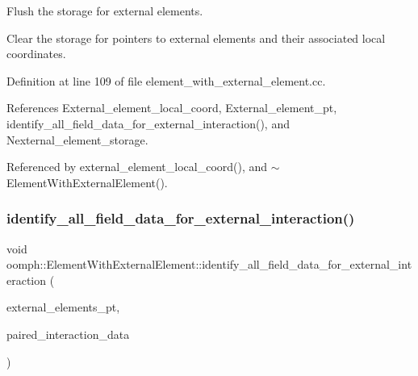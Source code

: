 Flush the storage for external elements. 

Clear the storage for pointers to external elements and their associated local coordinates. 

Definition at line 109 of file element\+\_\+with\+\_\+external\+\_\+element.\+cc.



References External\+\_\+element\+\_\+local\+\_\+coord, External\+\_\+element\+\_\+pt, identify\+\_\+all\+\_\+field\+\_\+data\+\_\+for\+\_\+external\+\_\+interaction(), and Nexternal\+\_\+element\+\_\+storage.



Referenced by external\+\_\+element\+\_\+local\+\_\+coord(), and $\sim$\+Element\+With\+External\+Element().

\mbox{\label{classoomph_1_1ElementWithExternalElement_a822d64019a82588e16053ec86f37226c}} 
\subsubsection{\texorpdfstring{identify\+\_\+all\+\_\+field\+\_\+data\+\_\+for\+\_\+external\+\_\+interaction()}{identify\_all\_field\_data\_for\_external\_interaction()}}
{\footnotesize\ttfamily void oomph\+::\+Element\+With\+External\+Element\+::identify\+\_\+all\+\_\+field\+\_\+data\+\_\+for\+\_\+external\+\_\+interaction (\begin{DoxyParamCaption}\item[{\hyperlink{classoomph_1_1Vector}{Vector}$<$ std\+::set$<$ \hyperlink{classoomph_1_1FiniteElement}{Finite\+Element} $\ast$$>$ $>$ const \&}]{external\+\_\+elements\+\_\+pt,  }\item[{std\+::set$<$ std\+::pair$<$ \hyperlink{classoomph_1_1Data}{Data} $\ast$, unsigned $>$ $>$ \&}]{paired\+\_\+interaction\+\_\+data }\end{DoxyParamCaption})\hspace{0.3cm}{\ttfamily [virtual]}}



